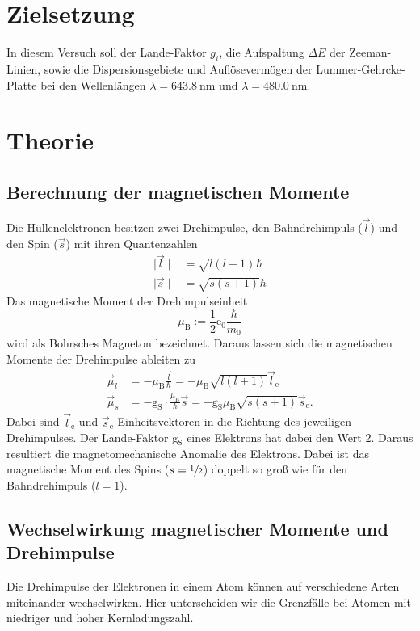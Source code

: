 \section{Zielsetzung}
\label{sec:Zielsetzung}
In diesem Versuch soll der Lande-Faktor $g_i$, die Aufspaltung $\Delta E$ der
Zeeman-Linien, sowie die Dispersionsgebiete und Auflösevermögen der
Lummer-Gehrcke-Platte bei den Wellenlängen $\lambda = \SI{643.8}{\nano\meter}$
und $\lambda = \SI{480.0}{\nano\meter}$.

\section{Theorie}
\label{sec:Theorie}
\subsection{Berechnung der magnetischen Momente}
\label{sec:Berechnung_magnetischer_Momente}
Die Hüllenelektronen besitzen zwei Drehimpulse, den Bahndrehimpuls ($\vec{l}$)
und den
Spin ($\vec{s}$) mit ihren Quantenzahlen
\begin{align}
  \mid\vec{l}\mid &= \sqrt{l\left(l+1\right)}\hbar \\
  \mid\vec{s}\mid &= \sqrt{s\left(s+1\right)}\hbar
  \label{eqn:Quantenzahlen}
\end{align}
Das magnetische Moment der Drehimpulseinheit \hbar
\begin{equation}
  \mu_\text{B} := \frac{1}{2}\text{e}_0 \frac{\hbar}{m_0}
  \label{eqn:bohr}
\end{equation}
wird als Bohrsches Magneton bezeichnet. Daraus lassen sich die magnetischen
Momente der Drehimpulse ableiten zu
\begin{align}
  \vec{\mu}_l &= -\mu_\text{B} \frac{\vec{l}}{\hbar} = -\mu_\text{B} \sqrt{l\left(l+1 \right)} \vec{l}_\text{e}\\
  \vec{\mu}_s &= -\text{g}_\text{S} \cdot \frac{\mu_\text{B}}{\hbar} \vec{s} = -\text{g}_\text{S} \mu_\text{B}\sqrt{s\left(s+1 \right)} \vec{s}_\text{e}.
  \label{eqn:momente}
\end{align}
Dabei sind $\vec{l}_\text{e}$ und $\vec{s}_\text{e}$ Einheitsvektoren in die Richtung
des jeweiligen Drehimpulses.
Der Lande-Faktor g$_\text{S}$ eines Elektrons hat dabei den Wert 2. Daraus resultiert die
magnetomechanische Anomalie des Elektrons. Dabei ist das magnetische Moment des
Spins ($s = \sfrac{\num{1}}{\num{2}}$) doppelt so groß wie für den Bahndrehimpuls
($l = \num{1}$).

\subsection{Wechselwirkung magnetischer Momente und Drehimpulse}
\label{sec:Wechselwirkungen}
Die Drehimpulse der Elektronen in einem Atom können auf verschiedene Arten
miteinander wechselwirken. Hier unterscheiden wir die Grenzfälle bei Atomen mit
niedriger und hoher Kernladungszahl.

